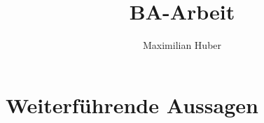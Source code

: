 \documentclass[12pt,oneside,ngerman]{amsart} %
\numberwithin{equation}{section}
\numberwithin{figure}{section}
\theoremstyle{plain}%
\theoremstyle{definition}
\theoremstyle{remark}
\begin{document}
\title{BA-Arbeit}
\author{Maximilian Huber}

\maketitle 
\tableofcontents{}
\newpage


\newpage


\newpage

\section{Weiterführende Aussagen}

\newpage

\appendix
{}


\end{document}
